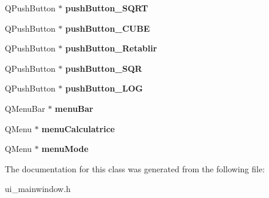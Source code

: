 \begin{DoxyCompactItemize}
\item 
\hypertarget{class_ui___main_window_ae69ab744692b908c4d5c4ffd482f2892}{Q\-Push\-Button $\ast$ {\bfseries push\-Button\-\_\-\-S\-Q\-R\-T}}\label{class_ui___main_window_ae69ab744692b908c4d5c4ffd482f2892}

\item 
\hypertarget{class_ui___main_window_afdf7eb816fe2e7034ff5ed605d5f4d4d}{Q\-Push\-Button $\ast$ {\bfseries push\-Button\-\_\-\-C\-U\-B\-E}}\label{class_ui___main_window_afdf7eb816fe2e7034ff5ed605d5f4d4d}

\item 
\hypertarget{class_ui___main_window_a567709bc6de59ba3cff86d2916868062}{Q\-Push\-Button $\ast$ {\bfseries push\-Button\-\_\-\-Retablir}}\label{class_ui___main_window_a567709bc6de59ba3cff86d2916868062}

\item 
\hypertarget{class_ui___main_window_ab617724bb0bb107b3256080ef0e80d5e}{Q\-Push\-Button $\ast$ {\bfseries push\-Button\-\_\-\-S\-Q\-R}}\label{class_ui___main_window_ab617724bb0bb107b3256080ef0e80d5e}

\item 
\hypertarget{class_ui___main_window_aa7f04d193b5e0060b44aa75554705ab3}{Q\-Push\-Button $\ast$ {\bfseries push\-Button\-\_\-\-L\-O\-G}}\label{class_ui___main_window_aa7f04d193b5e0060b44aa75554705ab3}

\item 
\hypertarget{class_ui___main_window_a2be1c24ec9adfca18e1dcc951931457f}{Q\-Menu\-Bar $\ast$ {\bfseries menu\-Bar}}\label{class_ui___main_window_a2be1c24ec9adfca18e1dcc951931457f}

\item 
\hypertarget{class_ui___main_window_a352bf63940a3905715e3dd8fa403d2cb}{Q\-Menu $\ast$ {\bfseries menu\-Calculatrice}}\label{class_ui___main_window_a352bf63940a3905715e3dd8fa403d2cb}

\item 
\hypertarget{class_ui___main_window_adc1fa8d84922a1ddea23394c75e3649f}{Q\-Menu $\ast$ {\bfseries menu\-Mode}}\label{class_ui___main_window_adc1fa8d84922a1ddea23394c75e3649f}

\end{DoxyCompactItemize}


The documentation for this class was generated from the following file\-:\begin{DoxyCompactItemize}
\item 
ui\-\_\-mainwindow.\-h\end{DoxyCompactItemize}
